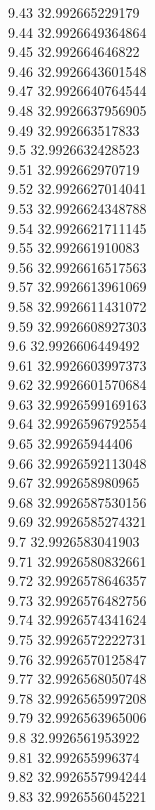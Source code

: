 {9.43	32.992665229179\\
9.44	32.9926649364864\\
9.45	32.992664646822\\
9.46	32.9926643601548\\
9.47	32.9926640764544\\
9.48	32.9926637956905\\
9.49	32.992663517833\\
9.5	32.9926632428523\\
9.51	32.992662970719\\
9.52	32.9926627014041\\
9.53	32.9926624348788\\
9.54	32.9926621711145\\
9.55	32.992661910083\\
9.56	32.9926616517563\\
9.57	32.9926613961069\\
9.58	32.9926611431072\\
9.59	32.9926608927303\\
9.6	32.9926606449492\\
9.61	32.9926603997373\\
9.62	32.9926601570684\\
9.63	32.9926599169163\\
9.64	32.9926596792554\\
9.65	32.99265944406\\
9.66	32.9926592113048\\
9.67	32.992658980965\\
9.68	32.9926587530156\\
9.69	32.9926585274321\\
9.7	32.9926583041903\\
9.71	32.9926580832661\\
9.72	32.9926578646357\\
9.73	32.9926576482756\\
9.74	32.9926574341624\\
9.75	32.9926572222731\\
9.76	32.9926570125847\\
9.77	32.9926568050748\\
9.78	32.9926565997208\\
9.79	32.9926563965006\\
9.8	32.9926561953922\\
9.81	32.992655996374\\
9.82	32.9926557994244\\
9.83	32.9926556045221\\
}
